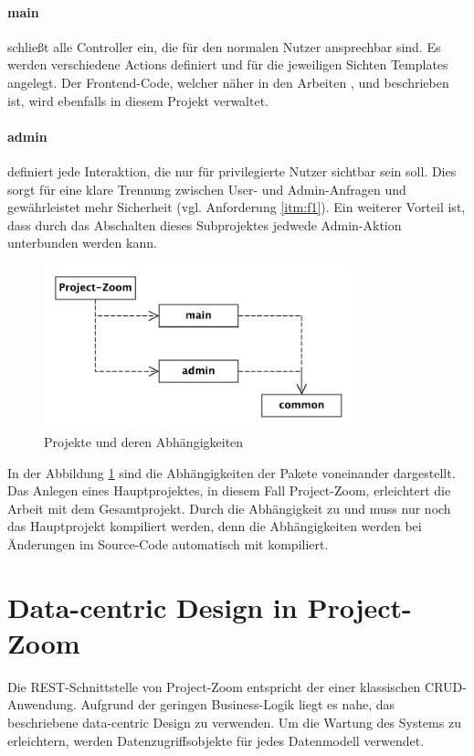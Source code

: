 \paragraph{main} schließt alle Controller ein, die für den normalen Nutzer ansprechbar sind. Es werden verschiedene Actions definiert und für die jeweiligen Sichten Templates angelegt. Der Frontend-Code, welcher näher in den Arbeiten \cite{bp-norman}, \cite{bp-tomh} und \cite{bp-anita} beschrieben ist, wird ebenfalls in diesem Projekt verwaltet.

\paragraph{admin} definiert jede Interaktion, die nur 
für privilegierte Nutzer sichtbar sein soll. Dies sorgt für eine klare Trennung zwischen User- und Admin-Anfragen und gewährleistet mehr Sicherheit (vgl. Anforderung \ref{itm:f1}). Ein weiterer Vorteil ist, dass durch das Abschalten dieses Subprojektes jedwede Admin-Aktion unterbunden werden kann.

\begin{figure}[h]  
  \centering     
  \includegraphics[width=0.8\textwidth]{img/projekte.pdf}  
   \caption{Projekte und deren Abhängigkeiten}   
  \label{fig:projects} 
\end{figure}

\FloatBarrier
In der Abbildung \ref{fig:projects} sind die Abhängigkeiten der Pakete voneinander dargestellt. Das Anlegen eines Hauptprojektes, in diesem Fall Project-Zoom, erleichtert die Arbeit mit dem Gesamtprojekt. Durch die Abhängigkeit zu  und  muss nur noch das Hauptprojekt kompiliert werden, denn die Abhängigkeiten werden bei Änderungen im Source-Code automatisch mit kompiliert.

\section{Data-centric Design in Project-Zoom}
\label{sec:umsetzung_dcd}
Die REST-Schnittstelle von Project-Zoom entspricht der einer klassischen CRUD-Anwendung. Aufgrund der geringen Business-Logik liegt es nahe, das beschriebene data-centric Design zu verwenden. Um die Wartung des Systems zu erleichtern, werden Datenzugriffsobjekte für jedes Datenmodell verwendet.
\\\\\\


